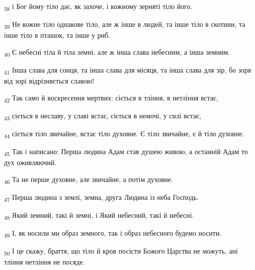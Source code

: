 \begin{tcolorbox}
\textsubscript{38} і Бог йому тіло дає, як захоче, і кожному зерняті тіло його.
\end{tcolorbox}
\begin{tcolorbox}
\textsubscript{39} Не кожне тіло однакове тіло, але ж інше в людей, та інше тіло в скотини, та інше тіло в пташок, та інше у риб.
\end{tcolorbox}
\begin{tcolorbox}
\textsubscript{40} Є небесні тіла й тіла земні, але ж інша слава небесним, а інша земним.
\end{tcolorbox}
\begin{tcolorbox}
\textsubscript{41} Інша слава для сонця, та інша слава для місяця, та інша слава для зір, бо зоря від зорі відрізняється славою!
\end{tcolorbox}
\begin{tcolorbox}
\textsubscript{42} Так само й воскресення мертвих: сіється в тління, в нетління встає,
\end{tcolorbox}
\begin{tcolorbox}
\textsubscript{43} сіється в неславу, у славі встає, сіється в немочі, у силі встає,
\end{tcolorbox}
\begin{tcolorbox}
\textsubscript{44} сіється тіло звичайне, встає тіло духовне. Є тіло звичайне, є й тіло духовне.
\end{tcolorbox}
\begin{tcolorbox}
\textsubscript{45} Так і написано: Перша людина Адам став душею живою, а останній Адам то дух оживляючий.
\end{tcolorbox}
\begin{tcolorbox}
\textsubscript{46} Та не перше духовне, але звичайне, а потім духовне.
\end{tcolorbox}
\begin{tcolorbox}
\textsubscript{47} Перша людина з землі, земна, друга Людина із неба Господь.
\end{tcolorbox}
\begin{tcolorbox}
\textsubscript{48} Який земний, такі й земні, і Який небесний, такі й небесні.
\end{tcolorbox}
\begin{tcolorbox}
\textsubscript{49} І, як носили ми образ земного, так і образ небесного будемо носити.
\end{tcolorbox}
\begin{tcolorbox}
\textsubscript{50} І це скажу, браття, що тіло й кров посісти Божого Царства не можуть, ані тління нетління не посяде.
\end{tcolorbox}
